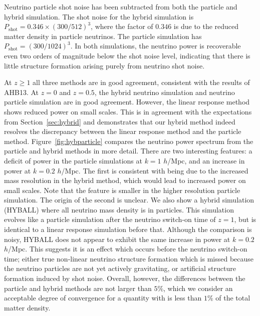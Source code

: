 \documentclass[useAMS, usenatbib]{mnras}
\begin{document}
Neutrino particle shot noise has been subtracted from both the particle and hybrid simulation. The shot noise for the hybrid simulation is $P_\mathrm{shot} = 0.346\times (300 /512)^3$, where the factor of $0.346$ is due to the reduced matter density in particle neutrinos. The particle simulation has $P_\mathrm{shot} = (300 /1024)^3$. In both simulations, the neutrino power is recoverable even two orders of magnitude below the shot noise level, indicating that there is little structure formation arising purely from neutrino shot noise.

At $z \geq 1$ all three methods are in good agreement, consistent with the results of AHB13. At $z = 0$ and $z=0.5$, the hybrid neutrino simulation and neutrino particle simulation are in good agreement. However, the linear response method shows reduced power on small scales. This is in agreement with the expectations from Section~\ref{sec:hybrid} and demonstrates that our hybrid method indeed resolves the discrepancy between the linear response method and the particle method. Figure~\ref{fig:hybparticle} compares the neutrino power spectrum from the particle and hybrid methods in more detail. There are two interesting features: a deficit of power in the particle simulations at $k=1$ $h$/Mpc, and an increase in power at $k=0.2$ $h$/Mpc. The first is consistent with being due to the increased mass resolution in the hybrid method, which would lead to increased power on small scales. Note that the feature is smaller in the higher resolution particle simulation. The origin of the second is unclear. We also show a hybrid simulation (HYBALL) where all neutrino mass density is in particles. This simulation evolves like a particle simulation after the neutrino switch-on time of $z=1$, but is identical to a linear response simulation before that. Although the comparison is noisy, HYBALL does not appear to exhibit the same increase in power at $k=0.2$ $h$/Mpc. This suggests it is an effect which occurs before the neutrino switch-on time; either true non-linear neutrino structure formation which is missed because the neutrino particles are not yet actively gravitating, or artificial structure formation induced by shot noise. Overall, however, the differences between the particle and hybrid methods are not larger than $5\%$, which we consider an acceptable degree of convergence for a quantity with is less than $1\%$ of the total matter density. 
\end{document}

